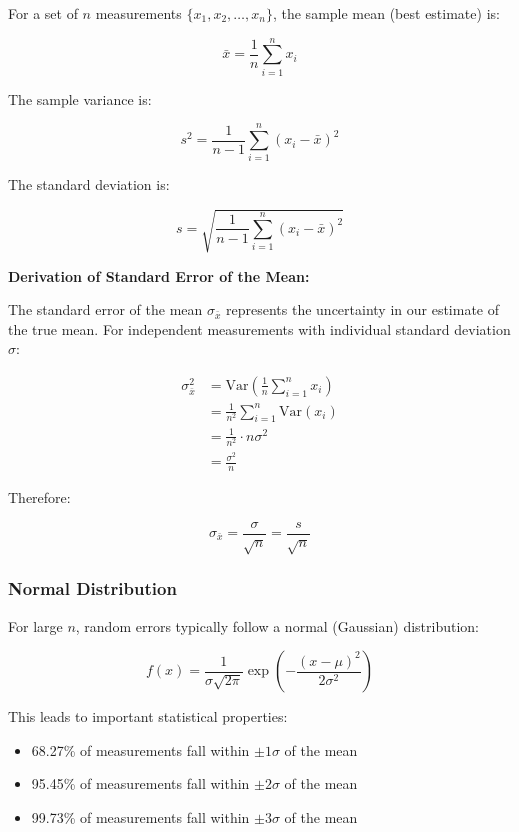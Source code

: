\documentclass[twoside]{book}
\begin{document}
For a set of $n$ measurements $\{x_1, x_2, \ldots, x_n\}$, the sample mean (best estimate) is:

\begin{equation*}
\bar{x} = \frac{1}{n}\sum_{i=1}^{n} x_i
\end{equation*}

The sample variance is:

\begin{equation*}
s^2 = \frac{1}{n-1}\sum_{i=1}^{n}(x_i - \bar{x})^2
\end{equation*}

The standard deviation is:

\begin{equation*}
s = \sqrt{\frac{1}{n-1}\sum_{i=1}^{n}(x_i - \bar{x})^2}
\end{equation*}

\textbf{Derivation of Standard Error of the Mean:}

The standard error of the mean $\sigma_{\bar{x}}$ represents the uncertainty in our estimate of the true mean. For independent measurements with individual standard deviation $\sigma$:

\begin{align*}
\sigma_{\bar{x}}^2 &= \text{Var}\left(\frac{1}{n}\sum_{i=1}^{n} x_i\right) \\
&= \frac{1}{n^2}\sum_{i=1}^{n}\text{Var}(x_i) \\
&= \frac{1}{n^2} \cdot n \sigma^2 \\
&= \frac{\sigma^2}{n}
\end{align*}

Therefore:

\begin{equation*}
\sigma_{\bar{x}} = \frac{\sigma}{\sqrt{n}} = \frac{s}{\sqrt{n}}
\end{equation*}

\subsubsection{Normal Distribution}

For large $n$, random errors typically follow a normal (Gaussian) distribution:

\begin{equation*}
f(x) = \frac{1}{\sigma\sqrt{2\pi}}\exp\left(-\frac{(x-\mu)^2}{2\sigma^2}\right)
\end{equation*}

This leads to important statistical properties:
\begin{itemize}
\item 68.27\% of measurements fall within $\pm 1\sigma$ of the mean
\item 95.45\% of measurements fall within $\pm 2\sigma$ of the mean
\item 99.73\% of measurements fall within $\pm 3\sigma$ of the mean
\end{itemize}
\end{document}
